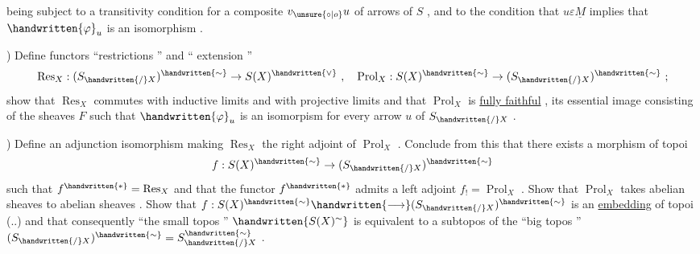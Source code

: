 being subject to a transitivity condition for a composite \(v_{\unsure{\circ|o}}u\) of arrows of \(S\) , and to the condition that \(u\varepsilon\underline{M}\) implies that \(\handwritten{\varphi}_u\) is an isomorphism .

) Define functors ``restrictions '' and `` extension ''
\[
\operatorname{Res}_X:(S_{\handwritten{/}X})^{\handwritten{\sim}}\to S(X)^{\handwritten{\vee}}\ ,\quad
\operatorname{Prol}_X:S(X)^{\handwritten{\sim}}\to(S_{\handwritten{/}X})^{\handwritten{\sim}}\ ;
\]
show that \(\operatorname{Res}_X\) commutes with inductive limits and with projective limits and that \(\operatorname{Prol}_X\) is \uline{fully faithful} , its essential image consisting of the sheaves \(F\) such that \(\handwritten{\varphi}_u\) is an isomorpism for every arrow \(u\) of  \(S_{\handwritten{/}X}\) .

) Define an adjunction isomorphism making \(\operatorname{Res}_X\) the right adjoint of \(\operatorname{Prol}_X\) . Conclude from this that there exists a morphism of topoi
\[
f:S(X)^{\handwritten{\sim}}\to(S_{\handwritten{/}X})^{\handwritten{\sim}}
\]
such that \(f^{\handwritten{*}}=\operatorname{Res}_X\) and that the functor \(f^{\handwritten{*}}\) admits a left adjoint \(f_!=\operatorname{Prol}_X\) . Show that \(\operatorname{Prol}_X\) takes abelian sheaves to abelian sheaves . Show that \(f:S(X)^{\handwritten{\sim}}\handwritten{\longrightarrow}(S_{\handwritten{/}X})^{\handwritten{\sim}}\) is an \uline{embedding} of topoi (..) and that consequently ``the small topos '' \(\handwritten{S(X)^{\sim}}\) is  equivalent to a subtopos of the ``big topos '' \((S_{\handwritten{/}X})^{\handwritten{\sim}}=S^{\handwritten{\sim}}_{\handwritten{/}X}\) .


